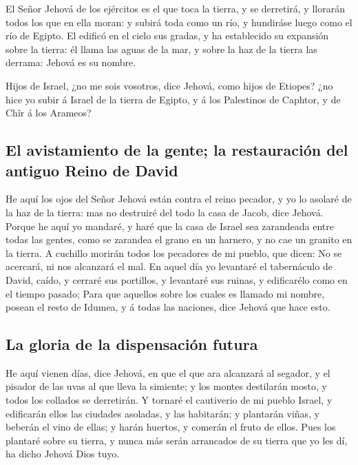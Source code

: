  El Señor Jehová de los ejércitos es el que toca la
tierra, y se derretirá, y llorarán todos los que en ella moran: y subirá
toda como un río, y hundiráse luego como el río de Egipto.
 El edificó en el cielo sus gradas, y ha establecido su
expansión sobre la tierra: él llama las aguas de la mar, y sobre la haz
de la tierra las derrama: Jehová es su nombre.

 Hijos de Israel, ¿no me sois vosotros, dice Jehová, como
hijos de Etiopes? ¿no hice yo subir á Israel de la tierra de Egipto, y á
los Palestinos de Caphtor, y de Chîr á los Arameos?

\hypertarget{el-avistamiento-de-la-gente-la-restauraciuxf3n-del-antiguo-reino-de-david}{%
\subsection{El avistamiento de la gente; la restauración del antiguo
Reino de
David}\label{el-avistamiento-de-la-gente-la-restauraciuxf3n-del-antiguo-reino-de-david}}

 He aquí los ojos del Señor Jehová están contra el reino
pecador, y yo lo asolaré de la haz de la tierra: mas no destruiré del
todo la casa de Jacob, dice Jehová.  Porque he aquí yo
mandaré, y haré que la casa de Israel sea zarandeada entre todas las
gentes, como se zarandea el grano en un harnero, y no cae un granito en
la tierra.  A cuchillo morirán todos los pecadores de mi
pueblo, que dicen: No se acercará, ni nos alcanzará el mal.
 En aquel día yo levantaré el tabernáculo de David,
caído, y cerraré sus portillos, y levantaré sus ruinas, y edificarélo
como en el tiempo pasado;  Para que aquellos sobre los
cuales es llamado mi nombre, posean el resto de Idumea, y á todas las
naciones, dice Jehová que hace esto.

\hypertarget{la-gloria-de-la-dispensaciuxf3n-futura}{%
\subsection{La gloria de la dispensación
futura}\label{la-gloria-de-la-dispensaciuxf3n-futura}}

 He aquí vienen días, dice Jehová, en que el que ara
alcanzará al segador, y el pisador de las uvas al que lleva la simiente;
y los montes destilarán mosto, y todos los collados se derretirán.
 Y tornaré el cautiverio de mi pueblo Israel, y
edificarán ellos las ciudades asoladas, y las habitarán; y plantarán
viñas, y beberán el vino de ellas; y harán huertos, y comerán el fruto
de ellos.  Pues los plantaré sobre su tierra, y nunca más
serán arrancados de su tierra que yo les dí, ha dicho Jehová Dios tuyo.
